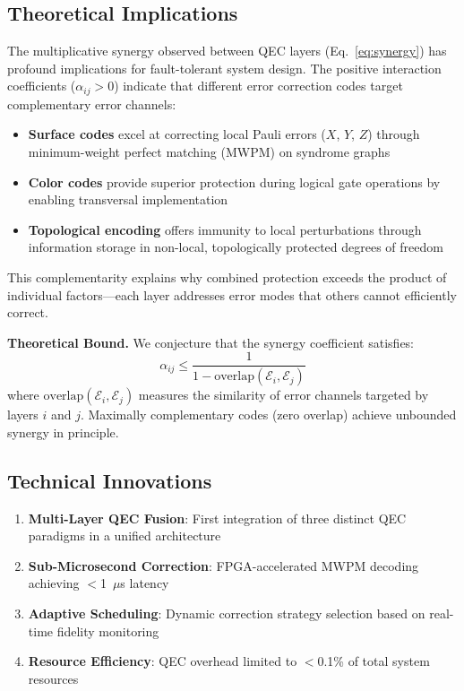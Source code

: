 \documentclass[12pt,a4paper]{article}
\theoremstyle{definition}
\begin{document}
\subsection{Theoretical Implications}
The multiplicative synergy observed between QEC layers (Eq.~\ref{eq:synergy}) has profound implications for fault-tolerant system design. The positive interaction coefficients ($\alpha_{ij} > 0$) indicate that different error correction codes target complementary error channels:
\begin{itemize}
    \item \textbf{Surface codes} excel at correcting local Pauli errors ($X$, $Y$, $Z$) through minimum-weight perfect matching (MWPM) on syndrome graphs
    \item \textbf{Color codes} provide superior protection during logical gate operations by enabling transversal implementation
    \item \textbf{Topological encoding} offers immunity to local perturbations through information storage in non-local, topologically protected degrees of freedom
\end{itemize}
This complementarity explains why combined protection exceeds the product of individual factors---each layer addresses error modes that others cannot efficiently correct.

\textbf{Theoretical Bound.} We conjecture that the synergy coefficient satisfies:
\begin{equation}
\alpha_{ij} \leq \frac{1}{1 - \text{overlap}(\mathcal{E}_i, \mathcal{E}_j)}
\end{equation}
where $\text{overlap}(\mathcal{E}_i, \mathcal{E}_j)$ measures the similarity of error channels targeted by layers $i$ and $j$. Maximally complementary codes (zero overlap) achieve unbounded synergy in principle.

\subsection{Technical Innovations}
\begin{enumerate}
    \item \textbf{Multi-Layer QEC Fusion}: First integration of three distinct QEC paradigms in a unified architecture
    \item \textbf{Sub-Microsecond Correction}: FPGA-accelerated MWPM decoding achieving $<$1~$\mu$s latency
    \item \textbf{Adaptive Scheduling}: Dynamic correction strategy selection based on real-time fidelity monitoring
    \item \textbf{Resource Efficiency}: QEC overhead limited to $<$0.1\% of total system resources
\end{enumerate}
\end{document}
